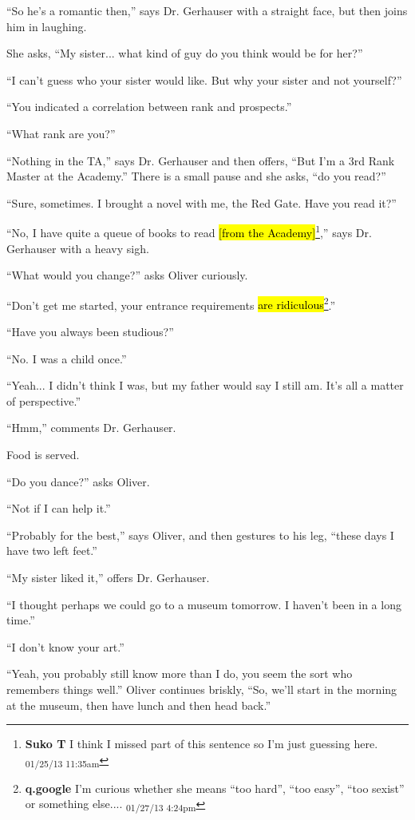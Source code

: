 ``So he's a romantic then,'' says Dr. Gerhauser with a straight face, but then joins him in laughing.

She asks, ``My sister... what kind of guy do you think would be for her?''

``I can't guess who your sister would like.  But why your sister and not yourself?''

``You indicated a correlation between rank and prospects.''

``What rank are you?''

``Nothing in the TA,'' says Dr. Gerhauser and then offers, ``But I'm a 3rd Rank Master at the Academy.''  There is a small pause and she asks, ``do you read?''

``Sure, sometimes.  I brought a novel with me, the Red Gate.  Have you read it?''

``No, I have quite a queue of books to read \hl{{[}from the Academy{]}}\footnote{\textbf{Suko T }I think I missed part of this sentence so I'm just guessing here. \textsubscript{01/25/13 11:35am}},'' says Dr. Gerhauser with a heavy sigh.

``What would you change?'' asks Oliver curiously.

``Don't get me started, your entrance requirements \hl{are ridiculous}\footnote{\textbf{q.google }I'm curious whether she means ``too hard'', ``too easy'', ``too sexist'' or something else.... \textsubscript{01/27/13 4:24pm}}.''

``Have you always been studious?''

``No. I was a child once.''

``Yeah... I didn't think I was, but my father would say I still am.  It's all a matter of perspective.''

``Hmm,'' comments Dr. Gerhauser.



Food is served. 



``Do you dance?'' asks Oliver.

``Not if I can help it.''

``Probably for the best,'' says Oliver, and then gestures to his leg, ``these days I have two left feet.''

``My sister liked it,'' offers Dr. Gerhauser.

``I thought perhaps we could go to a museum tomorrow.  I haven't been in a long time.''

``I don't know your art.''

``Yeah, you probably still know more than I do, you seem the sort who remembers things well.''  Oliver continues briskly, ``So, we'll start in the morning at the museum, then have lunch and then head back.''

